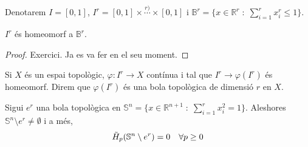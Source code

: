 \documentclass[../main.tex]{subfiles}
\begin{document}
Denotarem $I = [0,1]$, $I^r = [0,1]\times\overset{r)}{\cdots}\times [0,1]$ i $\mathbb{B}^r=\{x\in\mathbb{R}^r\;:\;\sum_{i=1}^r x_i^r\leq 1\}$.

\begin{nota}
$I^r$ és homeomorf a $\mathbb{B}^r$.
\end{nota}
\begin{proof}
Exercici. Ja es va fer en el seu moment.
\end{proof}

\begin{defi}
Si $X$ és un espai topològic, $\varphi:I^r\rightarrow X$ contínua i tal que $I^r\rightarrow \varphi(I^r)$ és homeomorf. Direm que $\varphi(I^r)$ és una bola topològica de dimensió $r$ en $X$.
\end{defi}

\begin{ter}[No-separació]
Sigui $e^r$ una bola topològica en $\mathbb{S}^n=\{x\in\mathbb{R}^{n+1}\;:\;\sum_{i=1}^r x_i^2=1\}$. Aleshores $\mathbb{S}^n\setminus e^r\not=\emptyset$ i a més,
\begin{equation}
    \notag
    \Tilde{H}_p(\mathbb{S}^n\setminus e^r) =0\quad\forall p\geq 0
\end{equation}
\end{ter}
\end{document}
